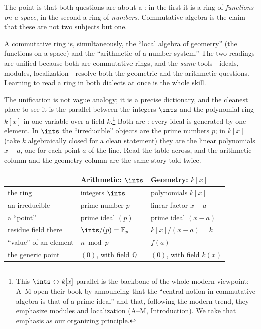 \documentclass[11pt]{article}
\begin{document}
The point is that both questions are about a : in the first it is a
ring of \emph{functions on a space}, in the second a ring of \emph{numbers}. Commutative
algebra is the claim that these are not two subjects but one.

\begin{iidea}
A commutative ring is, simultaneously, the ``local algebra of geometry'' (the functions on a
space) and the ``arithmetic of a number system.'' The two readings are unified because both
are commutative rings, and the \emph{same} tools---ideals, modules, localization---resolve
both the geometric and the arithmetic questions. Learning to read a ring in both dialects at
once is the whole skill.
\end{iidea}

The unification is not vague analogy; it is a precise dictionary, and the cleanest place to
see it is the parallel between the integers $\ints$ and the polynomial ring $k[x]$ in one
variable over a field $k$.\footnote{This $\ints \leftrightarrow k[x]$ parallel is the
backbone of the whole modern viewpoint; A--M open their book by announcing that the
``central notion in commutative algebra is that of a prime ideal'' and that, following the
modern trend, they emphasize modules and localization (A--M, Introduction). We take that
emphasis as our organizing principle.} Both are : every ideal
is generated by one element. In $\ints$ the ``irreducible'' objects are the prime numbers
$p$; in $k[x]$ (take $k$ algebraically closed for a clean statement) they are the linear
polynomials $x-a$, one for each point $a$ of the line. Read the table across, and the
arithmetic column and the geometry column are the same story told twice.

\begin{center}
\begin{tabular}{lll}
\hline
 & \textbf{Arithmetic: } $\ints$ & \textbf{Geometry: } $k[x]$ \\
\hline
the ring & integers $\ints$ & polynomials $k[x]$ \\
an irreducible & prime number $p$ & linear factor $x-a$ \\
a ``point'' & prime ideal $(p)$ & prime ideal $(x-a)$ \\
residue field there & $\ints/(p)=\mathbb{F}_p$ & $k[x]/(x-a)=k$ \\
``value'' of an element & $n \bmod p$ & $f(a)$ \\
the generic point & $(0)$, with field $\mathbb{Q}$ & $(0)$, with field $k(x)$ \\
\hline
\end{tabular}
\end{center}
\end{document}
